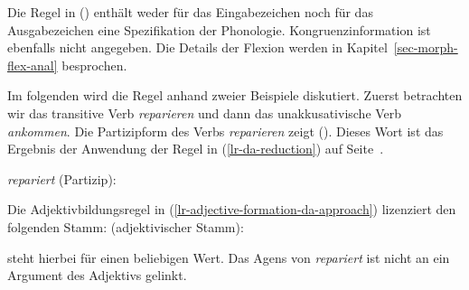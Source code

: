 {Die Regel in () enthält weder für das Eingabezeichen noch für das Ausgabezeichen eine Spezifikation der Phonologie.
Kongruenzinformation ist ebenfalls nicht angegeben. Die Details der Flexion werden in Kapitel~\ref{sec-morph-flex-anal}
besprochen.

Im folgenden wird die Regel anhand zweier Beispiele diskutiert. Zuerst betrachten wir
das transitive Verb \emph{reparieren} und dann das unakkusativische Verb \emph{ankommen}.
Die Partizipform des Verbs \emph{reparieren} zeigt (). Dieses Wort ist
das Ergebnis der Anwendung der Regel in (\ref{lr-da-reduction}) auf Seite~\pageref{lr-da-reduction}.

\eas
\emph{repariert} (Partizip):\\
\zs

\noindent
Die Adjektivbildungsregel in (\ref{lr-adjective-formation-da-approach}) lizenziert
den folgenden Stamm:
\eas
{} (adjektivischer Stamm):\\
\zs

\noindent
\etag steht hierbei für einen beliebigen Wert. Das Agens von \emph{repariert} ist nicht an ein
Argument des Adjektivs gelinkt.

}
